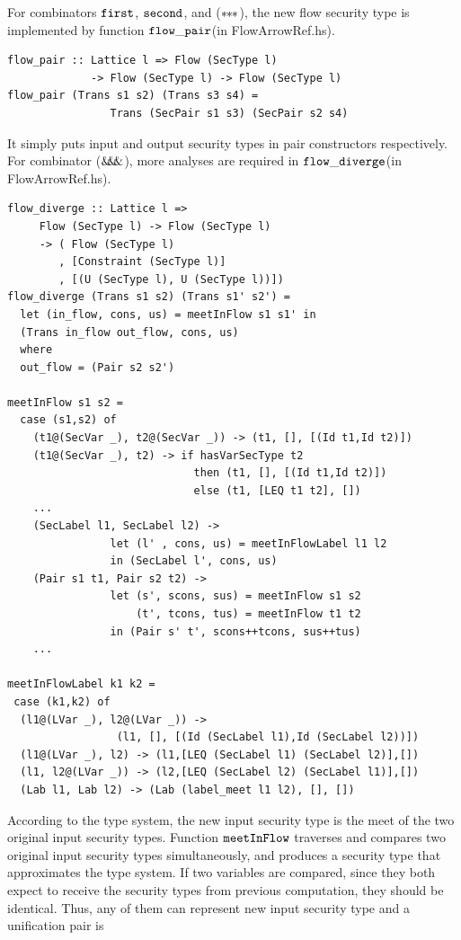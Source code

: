 \documentclass{report}
\newcommand{\arrowop}[1]{$#1\negthickspace #1\negthickspace #1$}
\newcommand{\co}[1]{$\cod{#1}$}
\begin{document}
For combinators \co{first}, \co{second}, and (\arrowop{*}), the new flow security type is implemented by 
function \co{flow\_pair}(in FlowArrowRef.hs). 
\begin{Verbatim}[fontsize=\small]
flow_pair :: Lattice l => Flow (SecType l) 
             -> Flow (SecType l) -> Flow (SecType l)
flow_pair (Trans s1 s2) (Trans s3 s4) = 
                Trans (SecPair s1 s3) (SecPair s2 s4)
\end{Verbatim}
It simply puts input and output security types in pair constructors respectively.
For combinator (\arrowop{\&}), more analyses are required 
in \co{flow\_diverge}(in FlowArrowRef.hs).
\begin{Verbatim}[fontsize=\small]
flow_diverge :: Lattice l => 
     Flow (SecType l) -> Flow (SecType l)
     -> ( Flow (SecType l)
        , [Constraint (SecType l)]
        , [(U (SecType l), U (SecType l))])
flow_diverge (Trans s1 s2) (Trans s1' s2') =
  let (in_flow, cons, us) = meetInFlow s1 s1' in
  (Trans in_flow out_flow, cons, us)
  where
  out_flow = (Pair s2 s2')

meetInFlow s1 s2 =
  case (s1,s2) of
    (t1@(SecVar _), t2@(SecVar _)) -> (t1, [], [(Id t1,Id t2)])
    (t1@(SecVar _), t2) -> if hasVarSecType t2
                             then (t1, [], [(Id t1,Id t2)])
                             else (t1, [LEQ t1 t2], [])
    ...
    (SecLabel l1, SecLabel l2) -> 
                let (l' , cons, us) = meetInFlowLabel l1 l2
                in (SecLabel l', cons, us)
    (Pair s1 t1, Pair s2 t2) -> 
                let (s', scons, sus) = meetInFlow s1 s2
                    (t', tcons, tus) = meetInFlow t1 t2
                in (Pair s' t', scons++tcons, sus++tus)
    ...

meetInFlowLabel k1 k2 =
 case (k1,k2) of
  (l1@(LVar _), l2@(LVar _)) -> 
                 (l1, [], [(Id (SecLabel l1),Id (SecLabel l2))])
  (l1@(LVar _), l2) -> (l1,[LEQ (SecLabel l1) (SecLabel l2)],[])
  (l1, l2@(LVar _)) -> (l2,[LEQ (SecLabel l2) (SecLabel l1)],[])
  (Lab l1, Lab l2) -> (Lab (label_meet l1 l2), [], [])
\end{Verbatim}
According to the type system, the new input security type is the meet of the two original input security types.
Function \co{meetInFlow} traverses and compares two original input security types simultaneously, 
and produces a security type that approximates the type system.
If two variables are compared, since they both expect to receive the security types from previous computation,
they should be identical. Thus, any of them can represent new input security type and a unification pair is 
\end{document}
